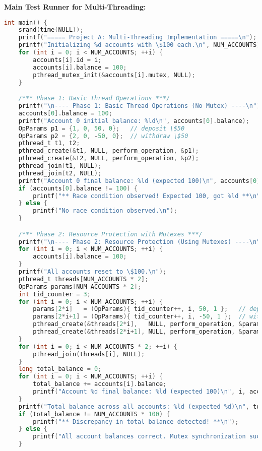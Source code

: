 \documentclass[11pt]{article}
\begin{document}
\textbf{Main Test Runner for Multi-Threading:}
\begin{lstlisting}[language=C,caption={Main Test Runner for Multi-Threading}]
int main() {
    srand(time(NULL));
    printf("===== Project A: Multi-Threading Implementation =====\n");
    printf("Initializing %d accounts with \$100 each.\n", NUM_ACCOUNTS);
    for (int i = 0; i < NUM_ACCOUNTS; ++i) {
        accounts[i].id = i;
        accounts[i].balance = 100;
        pthread_mutex_init(&accounts[i].mutex, NULL);
    }

    /*** Phase 1: Basic Thread Operations ***/
    printf("\n---- Phase 1: Basic Thread Operations (No Mutex) ----\n");
    accounts[0].balance = 100;
    printf("Account 0 initial balance: %ld\n", accounts[0].balance);
    OpParams p1 = {1, 0, 50, 0};   // deposit \$50
    OpParams p2 = {2, 0, -50, 0};  // withdraw \$50
    pthread_t t1, t2;
    pthread_create(&t1, NULL, perform_operation, &p1);
    pthread_create(&t2, NULL, perform_operation, &p2);
    pthread_join(t1, NULL);
    pthread_join(t2, NULL);
    printf("Account 0 final balance: %ld (expected 100)\n", accounts[0].balance);
    if (accounts[0].balance != 100) {
        printf("** Race condition observed! Expected 100, got %ld **\n", accounts[0].balance);
    } else {
        printf("No race condition observed.\n");
    }

    /*** Phase 2: Resource Protection with Mutexes ***/
    printf("\n---- Phase 2: Resource Protection (Using Mutexes) ----\n");
    for (int i = 0; i < NUM_ACCOUNTS; ++i) {
        accounts[i].balance = 100;
    }
    printf("All accounts reset to \$100.\n");
    pthread_t threads[NUM_ACCOUNTS * 2];
    OpParams params[NUM_ACCOUNTS * 2];
    int tid_counter = 3;
    for (int i = 0; i < NUM_ACCOUNTS; ++i) {
        params[2*i]   = (OpParams){ tid_counter++, i, 50, 1 };   // deposit \$50
        params[2*i+1] = (OpParams){ tid_counter++, i, -50, 1 };  // withdraw \$50
        pthread_create(&threads[2*i],   NULL, perform_operation, &params[2*i]);
        pthread_create(&threads[2*i+1], NULL, perform_operation, &params[2*i+1]);
    }
    for (int i = 0; i < NUM_ACCOUNTS * 2; ++i) {
        pthread_join(threads[i], NULL);
    }
    long total_balance = 0;
    for (int i = 0; i < NUM_ACCOUNTS; ++i) {
        total_balance += accounts[i].balance;
        printf("Account %d final balance: %ld (expected 100)\n", i, accounts[i].balance);
    }
    printf("Total balance across all accounts: %ld (expected %d)\n", total_balance, NUM_ACCOUNTS * 100);
    if (total_balance != NUM_ACCOUNTS * 100) {
        printf("** Discrepancy in total balance detected! **\n");
    } else {
        printf("All account balances correct. Mutex synchronization successful.\n");
    }


\end{lstlisting}
\end{document}

